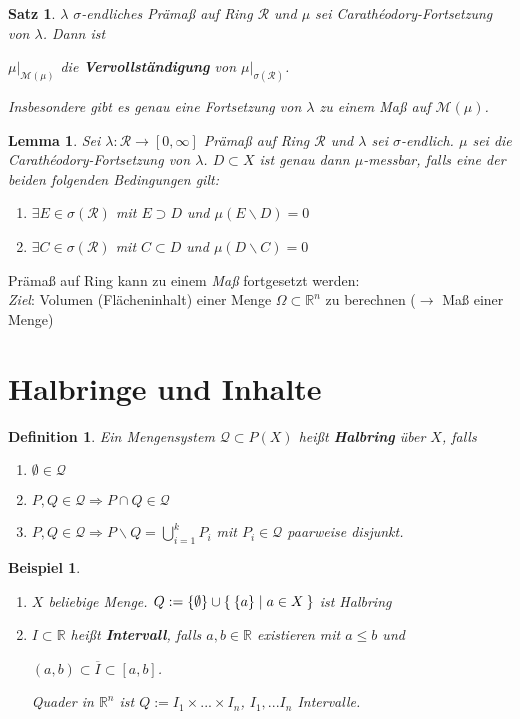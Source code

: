 \documentclass[11pt]{memoir}
\theoremstyle{changebreak}
\newtheorem{Definition}{Definition}[chapter]
\newtheorem{Beispiel}{Beispiel}[chapter]
\newtheorem{Lemma}{Lemma}[chapter]
\newtheorem{Satz}{Satz}[chapter]
\newcommand{\cara}{Carathéodory-Fortsetzung}
\begin{document}
\begin{Satz}
$\lambda$  $\sigma$-endliches Prämaß auf Ring $\mathscr R$ und $\mu$ sei \cara\; von $\lambda$. Dann ist 
\begin{center}
	$\mu|_{\mathscr M(\mu)}$ die \textbf{Vervollständigung} von $\mu|_{\sigma(\mathscr R)}$. 
\end{center}
Insbesondere gibt es genau eine Fortsetzung von $\lambda$ zu einem Maß auf $\mathscr M(\mu)$.
\end{Satz}

\begin{Lemma}
Sei $\lambda: \mathscr R \rightarrow [0, \infty]$ Prämaß auf Ring $\mathscr R$ und $\lambda$ sei $\sigma$-endlich. $\mu$ sei die \cara\; von $\lambda$. $D \subset X$ ist genau dann $\mu$-messbar, falls eine der beiden folgenden Bedingungen gilt:
\begin{enumerate}
	\item $\exists E \in \sigma(\mathscr R)$ mit $E \supset D$ und $\mu(E \backslash D) = 0$
	\item $\exists C \in \sigma(\mathscr R)$ mit $C \subset D$ und $\mu(D \backslash C) = 0$
\end{enumerate}
\end{Lemma}

Prämaß auf Ring kann zu einem \emph{Maß} fortgesetzt werden: \\
\emph{Ziel}: Volumen (Flächeninhalt) einer Menge $\Omega \subset \mathbb R^n$ zu berechnen ($\rightarrow$ Maß einer Menge)


\section{Halbringe und Inhalte}
\begin{Definition}
Ein Mengensystem $\mathscr Q \subset P(X)$ heißt \textbf{Halbring} über $X$, falls
\begin{enumerate}
	\item $\emptyset \in \mathscr Q$
	\item $P, Q \in \mathscr Q \Rightarrow P \cap Q \in \mathscr Q$
	\item $P, Q \in \mathscr Q \Rightarrow P \backslash Q = \bigcup\limits_{i=1}^k P_i$ mit $P_i \in \mathscr Q$ paarweise disjunkt.
\end{enumerate}
\end{Definition}

\begin{Beispiel}
\begin{enumerate}
	\item $X$ beliebige Menge. $Q := \{\emptyset\} \cup \Set{\{a\}|  a \in X}$ ist Halbring
	\item $I \subset \mathbb R$ heißt \textbf{Intervall}, falls $a, b \in \mathbb R$ existieren mit $a \leq b$ und 
	\begin{center}
		$(a, b) \subset \overline{I} \subset [a, b]$. 
	\end{center}
	Quader in $\mathbb R^n$ ist $ Q:= I_1 \times ... \times I_n$,  \quad $I_1, ... I_n$ Intervalle.
\end{enumerate}
\end{Beispiel}
\end{document}
